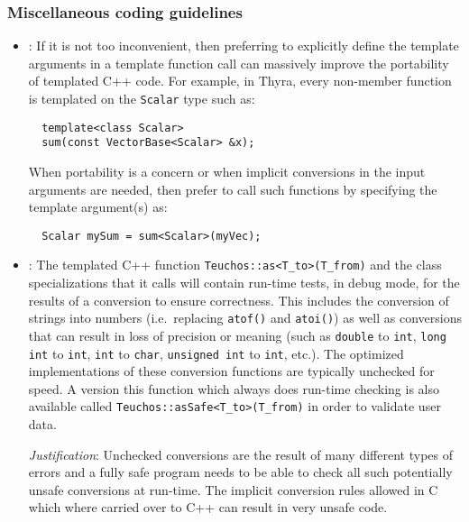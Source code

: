 %
\subsubsection{Miscellaneous coding guidelines}
%


\begin{itemize}


{}\item\GCGExplicitTemplateArguments: If it is not too inconvenient, then
preferring to explicitly define the template arguments in a template function
call can massively improve the portability of templated C++ code.  For
example, in Thyra, every non-member function is templated on the
{}\texttt{Scalar} type such as:

{\small\begin{verbatim}
  template<class Scalar>
  sum(const VectorBase<Scalar> &x);
\end{verbatim}}

When portability is a concern or when implicit conversions in the input
arguments are needed, then prefer to call such functions by specifying the
template argument(s) as:

{\small\begin{verbatim}
  Scalar mySum = sum<Scalar>(myVec);
\end{verbatim}}


{}\item\GCGTeuchosAs: The templated C++ function
{}\texttt{Teuchos::as<T\_to>(T\_from)} and the class specializations that it
calls will contain run-time tests, in debug mode, for the results of a
conversion to ensure correctness.  This includes the conversion of strings
into numbers (i.e.\ replacing {}\texttt{atof()} and {}\texttt{atoi()}) as well
as conversions that can result in loss of precision or meaning (such as
{}\texttt{double} to {}\texttt{int}, {}\texttt{long int} to {}\texttt{int},
{}\texttt{int} to {}\texttt{char}, {}\texttt{unsigned int} to {}\texttt{int},
etc.).  The optimized implementations of these conversion functions are
typically unchecked for speed.  A version this function which always does
run-time checking is also available called
{}\texttt{Teuchos\-::asSafe\-<\-T\_to\->\-(\-T\_from\-)} in order to validate
user data.


{}\textit{Justification}: Unchecked conversions are the result of many
different types of errors and a fully safe program needs to be able to check
all such potentially unsafe conversions at run-time.  The implicit conversion
rules allowed in C which where carried over to C++ can result in very unsafe
code.



\end{itemize}
